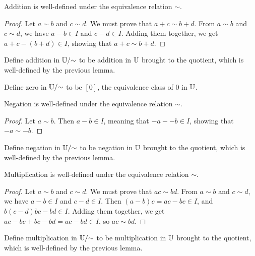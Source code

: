 \documentclass[../../math.tex]{subfiles}
\begin{document}
\begin{lemma}
    Addition is well-defined under the equivalence relation $\sim$.
\end{lemma}
\begin{proof}
    Let $a \sim b$ and $c \sim d$.  We must prove that $a + c \sim b + d$.  From
    $a \sim b$ and $c \sim d$, we have $a - b \in I$ and $c - d \in I$.  Adding
    them together, we get $a + c - (b + d) \in I$, showing that $a + c \sim b +
    d$.
\end{proof}

\begin{instance}
    Define addition in $\mathbb{U}/{\sim}$ to be addition in $\mathbb{U}$ brought to the
    quotient, which is well-defined by the previous lemma.
\end{instance}

\begin{instance}
    Define zero in $\mathbb{U}/{\sim}$ to be $[0]$, the equivalence class of $0$ in
    $\mathbb{U}$.
\end{instance}

\begin{lemma}
    Negation is well-defined under the equivalence relation $\sim$.
\end{lemma}
\begin{proof}
    Let $a \sim b$.  Then $a - b \in I$, meaning that $-a - -b \in I$, showing
    that $-a \sim -b$.
\end{proof}

\begin{instance}
    Define negation in $\mathbb{U}/{\sim}$ to be negation in $\mathbb{U}$ brought to the
    quotient, which is well-defined by the previous lemma.
\end{instance}

\begin{lemma}
    Multiplication is well-defined under the equivalence relation $\sim$.
\end{lemma}
\begin{proof}
    Let $a \sim b$ and $c \sim d$.  We must prove that $ac \sim bd$.  From $a
    \sim b$ and $c \sim d$, we have $a - b \in I$ and $c - d \in I$.  Then $(a -
    b)c = ac - bc \in I$, and $b(c - d) bc - bd \in I$.  Adding them together,
    we get $ac - bc + bc - bd = ac - bd \in I$, so $ac \sim bd$.
\end{proof}

\begin{instance}
    Define multiplication in $\mathbb{U}/{\sim}$ to be multiplication in $\mathbb{U}$ brought to
    the quotient, which is well-defined by the previous lemma.
\end{instance}
\end{document}
